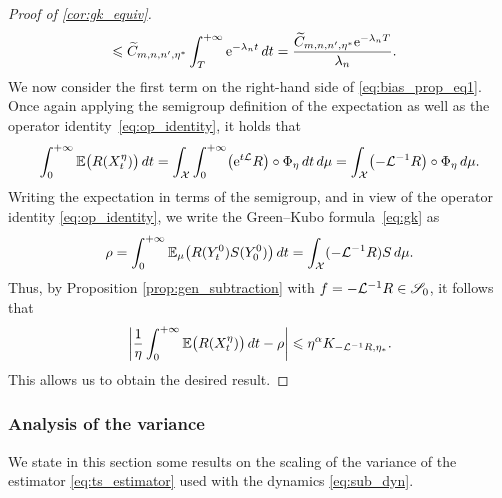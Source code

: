 \begin{proof}[Proof of \cref{cor:gk_equiv}]
\begin{align}
		&\leq \widetilde{C}_{m,n,n',\eta^*}\int_T^{+\infty} \e^{-\lambda_n t} \, dt %
		= \frac{\widetilde{C}_{m,n,n',\eta^*}\e^{-\lambda_n T}}{\lambda_n}. %
	\end{align}
	We now consider the first term on the right-hand side of \eqref{eq:bias_prop_eq1}. 
	Once again applying the semigroup definition of the expectation as well as the operator identity~\eqref{eq:op_identity}, it holds that
	\begin{align}
		\int_0^{+\infty} \E\bigl(R(X^\eta_t)\bigr) \, dt %
		= \int_\mathcal{X}\int_0^{+\infty} \bigl(\e^{t\L}R\bigr)\circ \Phi_\eta \, dt \, d\mu
		= \int_\mathcal{X} \bigl(-\L^{-1}R\bigr)\circ \Phi_\eta \, d\mu.
		\label{eq:cor_Tint_to_LinvR}
	\end{align}
	Writing the expectation in terms of the semigroup, and in view of the operator identity \eqref{eq:op_identity}, we write the Green--Kubo formula~\eqref{eq:gk} as
	\begin{align}
		\rho = \int_0^{+\infty} \mathbb{E}_\mu\bigl(R(Y_t^0)S(Y_0^0)\bigr) \, dt = \int_\mathcal{X} (-\mathcal{L}^{-1}R)S \, d\mu.
	\end{align}
	Thus, by Proposition \ref{prop:gen_subtraction} with $f = -\mathcal{L}^{-1}R \in \mathscr{S}_0$, it follows that
	\begin{equation}
		\abs*{\frac{1}{\eta}\int_0^{+\infty} \E\bigl(R(X^\eta_t)\bigr) \, dt - \rho} \leq \eta^{\alpha} K_{-\L^{-1}R,\eta_*}.
		\label{eq:cor_eta_bias}
	\end{equation}
	This allows us to obtain the desired result.
\end{proof}

\subsubsection{Analysis of the variance}
\label{subsubsec:variance_analysis}
We state in this section some results on the scaling of the variance of the estimator \eqref{eq:ts_estimator} used with the dynamics \eqref{eq:sub_dyn}.

